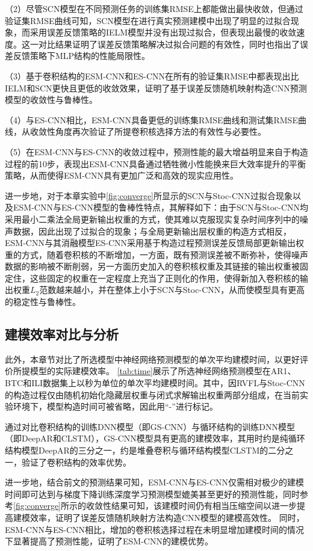 （2）尽管SCN模型在不同预测任务的训练集RMSE上都能做出最快收敛，但通过验证集RMSE曲线可知，SCN模型在进行真实预测建模中出现了明显的过拟合现象，而采用误差反馈策略的IELM模型并没有出现过拟合，但表现出最慢的收敛速度。这一对比结果证明了误差反馈策略解决过拟合问题的有效性，同时也指出了误差反馈策略下MLP结构的性能局限性。

（3）基于卷积结构的ESM-CNN和ES-CNN在所有的验证集RMSE中都表现出比IELM和SCN更快且更低的收敛效果，证明了基于误差反馈随机映射构造CNN预测模型的收敛性与鲁棒性。

（4）与ES-CNN相比，ESM-CNN具备更低的训练集RMSE曲线和测试集RMSE曲线，从收敛性角度再次验证了所提卷积核选择方法的有效性与必要性。

（5）在ESM-CNN与ES-CNN的收敛过程中，预测性能的最大增益明显来自于构造过程的前10步，表现出ESM-CNN具备通过牺牲微小性能换来巨大效率提升的平衡策略，从而使得ESM-CNN具有更加广泛和高效的现实应用性。


进一步地，对于本章实验中\autoref{fig:converge}所显示的SCN与Stoc-CNN过拟合现象以及ESM-CNN与ES-CNN模型的鲁棒性特点，其解释如下：由于SCN与Stoc-CNN均采用最小二乘法全局更新输出权重的方式，使其难以克服现实复杂时间序列中的噪声数据，因此出现了过拟合的现象；与全局更新输出层权重的构造方式相反，ESM-CNN与其消融模型ES-CNN采用基于构造过程预测误差反馈局部更新输出权重的方式，随着卷积核的不断增加，一方面，既有预测误差被不断弥补，使得噪声数据的影响被不断削弱，另一方面历史加入的卷积核权重及其链接的输出权重被固定住，这些固定的权重在一定程度上充当了正则化的作用，使得新加入卷积核的输出权重$L_2$范数越来越小，并在整体上小于SCN与Stoc-CNN，从而使模型具有更高的稳定性与鲁棒性。


\subsection{建模效率对比与分析}

此外，本章节对比了所选模型中神经网络预测模型的单次平均建模时间，以更好评价所提模型的实际建模效率。
\autoref{tab:time}展示了所选神经网络预测模型在AR1、BTC和ILI数据集上以秒为单位的单次平均建模时间。其中，因RVFL与Stoc-CNN的构造过程仅由随机初始化隐藏层权重与闭式求解输出权重两部分组成，在当前实验环境下，模型构造时间可被省略，因此用“-”进行标记。

通过对比卷积结构的训练DNN模型（即GS-CNN）与循环结构的训练DNN模型（即DeepAR和CLSTM），GS-CNN模型具有更高的建模效率，其用时约是纯循环结构模型DeepAR的三分之一，约是堆叠卷积与循环结构模型CLSTM的二分之一，验证了卷积结构的效率优势。

进一步地，结合前文的预测结果可知，ESM-CNN与ES-CNN仅需相对极少的建模时间即可达到与梯度下降训练深度学习预测模型媲美甚至更好的预测性能，同时参考\autoref{fig:converge}所示的收敛性结果可知，该建模时间仍有相当压缩空间以进一步提高建模效率，证明了误差反馈随机映射方法构造CNN模型的建模高效性。
同时，ESM-CNN与ES-CNN相比，增加的卷积核选择过程在未明显增加建模时间的情况下显著提高了预测性能，证明了ESM-CNN的建模优势。

